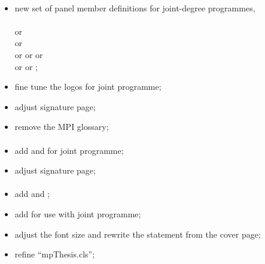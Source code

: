 \paragraph{}
	\begin{itemize}[noitemsep]
        \item new set of panel member definitions for joint-degree programmes, \\
             \\
             or  \\
             or  \\
             or  or  or  \\
             or  or ;
		\item fine tune the logos for joint programme;
		\item adjust signature page;
        \item remove the MPI glossary;
	\end{itemize}

\paragraph{}

	\begin{itemize}[noitemsep]
		\item add  and  for joint programme;
		\item adjust signature page;
	\end{itemize}

\paragraph{}
	\begin{itemize}[noitemsep]
		\item add  and ;
		\item add  for use with joint programme;
		\item adjust the font size and rewrite the statement from the cover page;
		\item refine ``mpThesis.cls'';
	\end{itemize}

